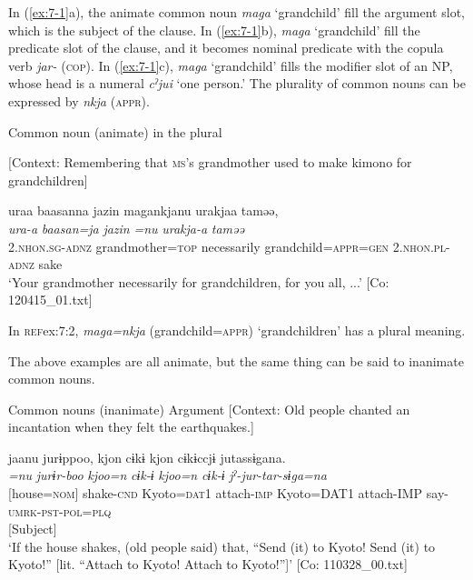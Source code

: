 \z
\z

In (\ref{ex:7-1}a), the animate common noun \textit{maga} ‘grandchild’ fill the argument slot, which is the subject of the clause. In (\ref{ex:7-1}b), \textit{maga} ‘grandchild’ fill the predicate slot of the clause, and it becomes nominal predicate with the copula verb \textit{jar-} (\textsc{cop}). In (\ref{ex:7-1}c), \textit{maga} ‘grandchild’ fills the modifier slot of an NP, whose head is a numeral \textit{cˀjui} ‘one person.’ The plurality of common nouns can be expressed by \textit{nkja} (\textsc{appr}).

\ea \label{ex:7:2}  Common noun (animate) in the plural

  [Context: Remembering that \textsc{ms}’s grandmother used to make kimono for grandchildren]

{\TM}
\glll uraa  baasanna  jazin  magankjanu urakjaa  taməə,\\
\textit{ura-a}  \textit{baasan=ja}  \textit{jazin}  \textit{=nu}   \textit{urakja-a}  \textit{taməə}\\
    2.\textsc{nhon}.\textsc{sg}-\textsc{adnz}  grandmother=\textsc{top}  necessarily  grandchild=\textsc{appr}=\textsc{gen}  2.\textsc{nhon}.\textsc{pl}-\textsc{adnz}  sake\\
\glt    ‘Your grandmother necessarily for grandchildren, for you all, ...’ [Co: 120415\_01.txt]

\z

In \textsc{ref}{ex:7:2}, \textit{maga=nkja} (grandchild=\textsc{appr}) ‘grandchildren’ has a plural meaning.

  The above examples are all animate, but the same thing can be said to inanimate common nouns.

\ea \label{ex:7:3}  Common nouns (inanimate)
\ea \label{ex:7:3a}Argument
    [Context: Old people chanted an incantation when they felt the earthquakes.]

{\TM}
\gllll  jaanu  jurɨppoo,  kjon  cɨkɨ  kjon   cɨkɨccjɨ  jutassɨgana.\\
\textit{=nu}  \textit{jurɨr-boo}  \textit{kjoo=n}  \textit{cɨk-ɨ}  \textit{kjoo=n}   \textit{cɨk-ɨ}  \textit{jˀ-jur-tar-sɨga=na}\\
{}[house=\textsc{nom}]  shake-\textsc{cnd}  Kyoto=\textsc{dat}1  attach-\textsc{imp}  Kyoto=DAT1  attach-IMP  say-\textsc{umrk}-\textsc{pst}-\textsc{pol}=\textsc{plq}\\
{}[Subject]        \\
\glt ‘If the house shakes, (old people said) that, “Send (it) to Kyoto! Send (it) to Kyoto!” [lit. “Attach to Kyoto! Attach to Kyoto!”]’ [Co: 110328\_00.txt]

